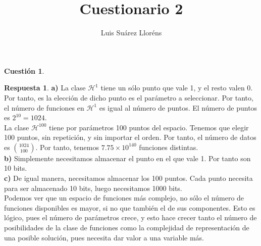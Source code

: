 \documentclass[10pt,a4paper]{article}
\author{Luis Suárez Lloréns}
\title{Cuestionario 2}
\date{}
\theoremstyle{definition}
\newtheorem{cuestion}{Cuestión}
\newtheorem*{respuesta}{Respuesta}
\begin{document}
\maketitle

\begin{cuestion}
\end{cuestion}
\begin{respuesta}
\textbf{a)}
La clase $\mathcal{H}^1$ tiene un sólo punto que vale 1, y el resto valen 0. Por tanto, es la elección de dicho punto es el parámetro a seleccionar. Por tanto, el número de funciones en $\mathcal{H}^1$ es igual al número de puntos. El número de puntos es $2^{10} = 1024$.\\

La clase $\mathcal{H}^{100}$ tiene por parámetros 100 puntos del espacio. Tenemos que elegir 100 puntos, sin repetición, y sin importar el orden. Por tanto, el número de datos es $\binom{1024}{100}$. Por tanto, tenemos $7.75 \times 10^{140} $ funciones distintas.\\

\textbf{b)}
Simplemente necesitamos almacenar el punto en el que vale 1. Por tanto son 10 bits.\\

\textbf{c)}
De igual manera, necesitamos almacenar los 100 puntos. Cada punto necesita para ser almacenado 10 bits, luego necesitamos 1000 bits.\\

Podemos ver que un espacio de funciones más complejo, no sólo el número de funciones disponibles es mayor, si no que también el de sus componentes. Esto es lógico, pues el número de parámetros crece, y esto hace crecer tanto el número de posibilidades de la clase de funciones como la complejidad de representación de una posible solución, pues necesita dar valor a una variable más.\\
\end{respuesta}
\end{document}
